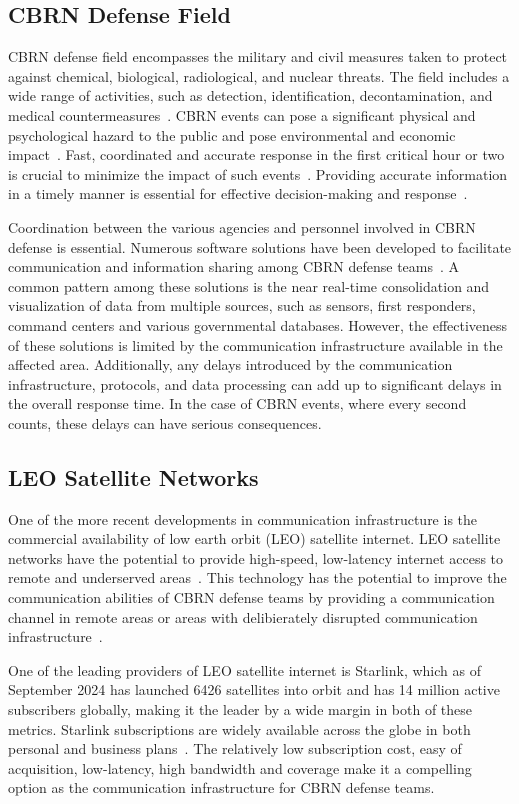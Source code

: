 \subsection{CBRN Defense Field}
CBRN defense field encompasses the military and civil measures taken to protect against chemical, biological, radiological, and nuclear threats. The field includes a wide range of activities, such as detection, identification, decontamination, and medical countermeasures~\citep{Otrisal2014}. CBRN events can pose a significant physical and psychological hazard to the public and pose environmental and economic impact~\citep{MOHMalaysia2025}. Fast, coordinated and accurate response in the first critical hour or two is crucial to minimize the impact of such events~\citep{JESIP2016}. Providing accurate information in a timely manner is essential for effective decision-making and response~\citep{MOHMalaysia2025}.
\par
Coordination between the various agencies and personnel involved in CBRN defense is essential. Numerous software solutions have been developed to facilitate communication and information sharing among CBRN defense teams~\citep{Marques2025,EnvironicsEnviScreenX,BruhnNewTechFrontline,ObservisObsasLink}. A common pattern among these solutions is the near real-time consolidation and visualization of data from multiple sources, such as sensors, first responders, command centers and various governmental databases. However, the effectiveness of these solutions is  limited by the communication infrastructure available in the affected area. Additionally, any delays introduced by the communication infrastructure, protocols, and data processing can add up to significant delays in the overall response time. In the case of CBRN events, where every second counts, these delays can have serious consequences.
\subsection{LEO Satellite Networks}
One of the more recent developments in communication infrastructure is the commercial availability of low earth orbit (LEO) satellite internet. LEO satellite networks have the potential to provide high-speed, low-latency internet access to remote and underserved areas~\citep{DuanTong2021SSNC}. This technology has the potential to improve the communication abilities of CBRN defense teams by providing a communication channel in remote areas or areas with delibierately disrupted communication infrastructure~\citep{AbelsJoscha2024Piig}.
\par
One of the leading providers of LEO satellite internet is Starlink, which as of September 2024 has launched 6426 satellites into orbit and has 14 million active subscribers globally, making it the leader by a wide margin in both of these metrics. Starlink subscriptions are widely available across the globe in both personal and business plans~\citep{KooshaBehzad2025CAoR}. The relatively low subscription cost, easy of acquisition, low-latency, high bandwidth and coverage make it a compelling option as the communication infrastructure for CBRN defense teams.
